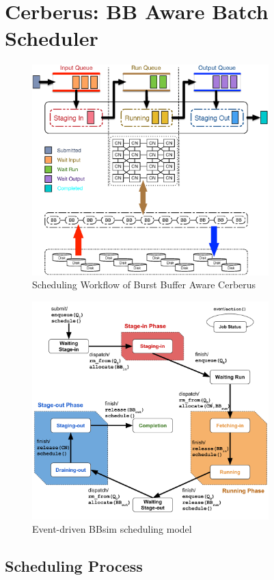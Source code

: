 \section{Cerberus: BB Aware Batch Scheduler}
\label{Sec:Scheduler}

\begin{figure}[htp]
        \centering
        \includegraphics[width=3.6in]{CerberusBBSystem}
        \caption{Scheduling Workflow of Burst Buffer Aware Cerberus}
        \label{Fig:CerberusQueues}
\end{figure}

\begin{figure}[htp]
\centering
        \includegraphics[width=3.6in]{3PhaseJobFSM}
        \caption{Event-driven BBsim scheduling model}
\label{Fig:JobFSM}
\end{figure}

\subsection{Scheduling Process}

